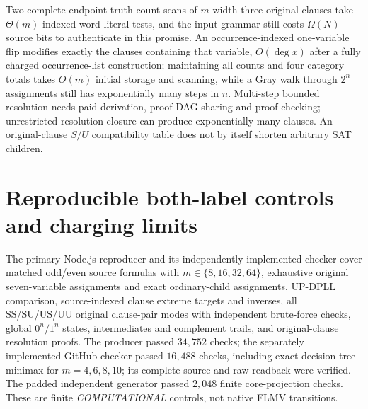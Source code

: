 \documentclass[11pt]{article}
\begin{document}
Two complete endpoint truth-count scans of $m$ width-three original clauses take $\Theta(m)$ indexed-word literal tests, and the input grammar still costs $\Omega(N)$ source bits to authenticate in this promise. An occurrence-indexed one-variable flip modifies exactly the clauses containing that variable, $O(\deg x)$ after a fully charged occurrence-list construction; maintaining all counts and four category totals takes $O(m)$ initial storage and scanning, while a Gray walk through $2^n$ assignments still has exponentially many steps in $n$. Multi-step bounded resolution needs paid derivation, proof DAG sharing and proof checking; unrestricted resolution closure can produce exponentially many clauses. An original-clause $S/U$ compatibility table does not by itself shorten arbitrary SAT children.

\section{Reproducible both-label controls and charging limits}
The primary Node.js reproducer and its independently implemented checker cover matched odd/even source formulas with $m\in\{8,16,32,64\}$, exhaustive original seven-variable assignments and exact ordinary-child assignments, UP-DPLL comparison, source-indexed clause extreme targets and inverses, all SS/SU/US/UU original clause-pair modes with independent brute-force checks, global $0^n/1^n$ states, intermediates and complement trails, and original-clause resolution proofs. The producer passed $34{,}752$ checks; the separately implemented GitHub checker passed $16{,}488$ checks, including exact decision-tree minimax for $m=4,6,8,10$; its complete source and raw readback were verified. The padded independent generator passed $2{,}048$ finite core-projection checks. These are finite \emph{COMPUTATIONAL} controls, not native FLMV transitions.
\end{document}
